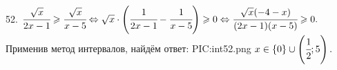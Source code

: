 52. $\cfrac{\sqrt{x}}{2x-1}\geqslant\cfrac{\sqrt{x}}{x-5}\Leftrightarrow\sqrt{x}\cdot\left(\cfrac{1}{2x-1}-\cfrac{1}{x-5}\right)\geqslant0\Leftrightarrow
\cfrac{\sqrt{x}(-4-x)}{(2x-1)(x-5)}\geqslant0.$ Применив метод интервалов, найдём ответ:
{{PIC:int52.png}}
$x\in\{0\}\cup\left(\cfrac{1}{2};5\right).$\\
